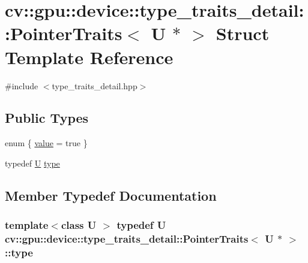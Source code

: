 \hypertarget{structcv_1_1gpu_1_1device_1_1type__traits__detail_1_1PointerTraits_3_01U_01_5_01_4}{\section{cv\-:\-:gpu\-:\-:device\-:\-:type\-\_\-traits\-\_\-detail\-:\-:Pointer\-Traits$<$ U $\ast$ $>$ Struct Template Reference}
\label{structcv_1_1gpu_1_1device_1_1type__traits__detail_1_1PointerTraits_3_01U_01_5_01_4}
}


{\ttfamily \#include $<$type\-\_\-traits\-\_\-detail.\-hpp$>$}

\subsection*{Public Types}
\begin{DoxyCompactItemize}
\item 
enum \{ \hyperlink{structcv_1_1gpu_1_1device_1_1type__traits__detail_1_1PointerTraits_3_01U_01_5_01_4_ad6292be268acb08e8dcde957a9fad358aa292e800d63c69c973cc1b1a732f6725}{value} = true
 \}
\item 
typedef \hyperlink{core__c_8h_aa9c521f41af9a5191e5e4b6ffbae211a}{U} \hyperlink{structcv_1_1gpu_1_1device_1_1type__traits__detail_1_1PointerTraits_3_01U_01_5_01_4_a41b92061487f31dd5ff5496b0e1784b5}{type}
\end{DoxyCompactItemize}


\subsection{Member Typedef Documentation}
\hypertarget{structcv_1_1gpu_1_1device_1_1type__traits__detail_1_1PointerTraits_3_01U_01_5_01_4_a41b92061487f31dd5ff5496b0e1784b5}{
\subsubsection[{type}]{\setlength{\rightskip}{0pt plus 5cm}template$<$class U $>$ typedef {\bf U} {\bf cv\-::gpu\-::device\-::type\-\_\-traits\-\_\-detail\-::\-Pointer\-Traits}$<$ {\bf U} $\ast$ $>$\-::{\bf type}}}\label{structcv_1_1gpu_1_1device_1_1type__traits__detail_1_1PointerTraits_3_01U_01_5_01_4_a41b92061487f31dd5ff5496b0e1784b5}


